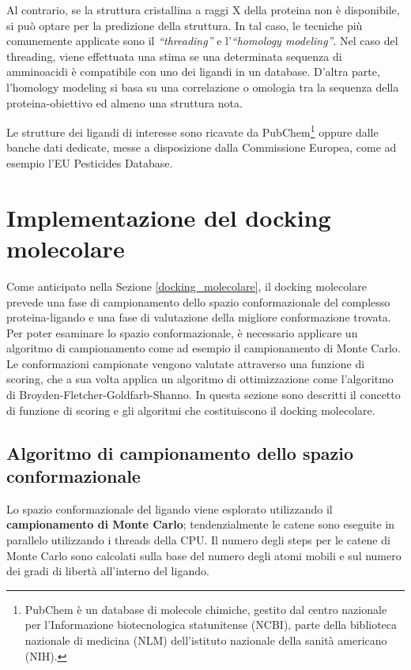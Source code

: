 Al contrario, se la struttura cristallina a raggi X della proteina non è disponibile, si può optare per la predizione della struttura. In tal caso, le tecniche più comunemente applicate sono il \textit{“threading”} e l'\textit{“homology modeling”}. Nel caso del threading, viene effettuata una stima se una determinata sequenza di amminoacidi è compatibile con uno dei ligandi in un database.
D'altra parte, l'homology modeling si basa su una correlazione o omologia tra la sequenza della proteina-obiettivo ed almeno una struttura nota. \cite{roy_chapter_2015}

Le strutture dei ligandi di interesse sono ricavate da PubChem\footnote{PubChem è un database di molecole chimiche, gestito dal centro nazionale per l'Informazione biotecnologica statunitense (NCBI), parte della biblioteca nazionale di medicina (NLM) dell'istituto nazionale della sanità americano (NIH).} oppure dalle banche dati dedicate, messe a disposizione dalla Commissione Europea, come ad esempio l'EU Pesticides Database.


\section{Implementazione del docking molecolare} \label{implementazione_docking}
Come anticipato nella Sezione \ref{docking_molecolare}, il docking molecolare prevede una fase di campionamento dello spazio conformazionale del complesso proteina-ligando e una fase di valutazione della migliore conformazione trovata. 
Per poter esaminare lo spazio conformazionale, è necessario applicare un algoritmo di campionamento come ad esempio il campionamento di Monte Carlo. Le conformazioni campionate vengono valutate attraverso una funzione di scoring, che a sua volta applica un algoritmo di ottimizzazione come l'algoritmo di Broyden-Fletcher-Goldfarb-Shanno.
In questa sezione sono descritti il concetto di funzione di scoring e gli algoritmi che costituiscono il docking molecolare.

\subsection{Algoritmo di campionamento dello spazio conformazionale}
Lo spazio conformazionale del ligando viene esplorato utilizzando il \textbf{campionamento di Monte Carlo}; tendenzialmente le catene sono eseguite in parallelo utilizzando i threads della CPU. Il numero degli steps per le catene di Monte Carlo sono calcolati sulla base del numero degli atomi mobili e sul numero dei gradi di libertà all'interno del ligando. 

